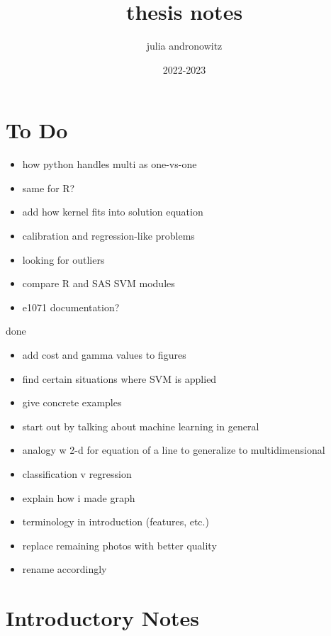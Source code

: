 \documentclass{article}
\title{thesis notes}
\author{julia andronowitz }
\date{2022-2023}
\begin{document}
\maketitle

\section{To Do}

\begin{itemize}
    \item how python handles multi as one-vs-one
    \item same for R?
    \item add how kernel fits into solution equation
    \item calibration and regression-like problems
    \item looking for outliers
    \item compare R and SAS SVM modules
    \item e1071 documentation?
\end{itemize}

done
\begin{itemize}
    \item add cost and gamma values to figures
    \item find certain situations where SVM is applied
    \item give concrete examples
    \item start out by talking about machine learning in general
    \item analogy w 2-d for equation of a line to generalize to multidimensional
    \item classification v regression
    \item explain how i made graph
    \item terminology in introduction (features, etc.)
    \item replace remaining photos with better quality
    \item rename accordingly
\end{itemize}

\section{Introductory Notes}
\end{document}
